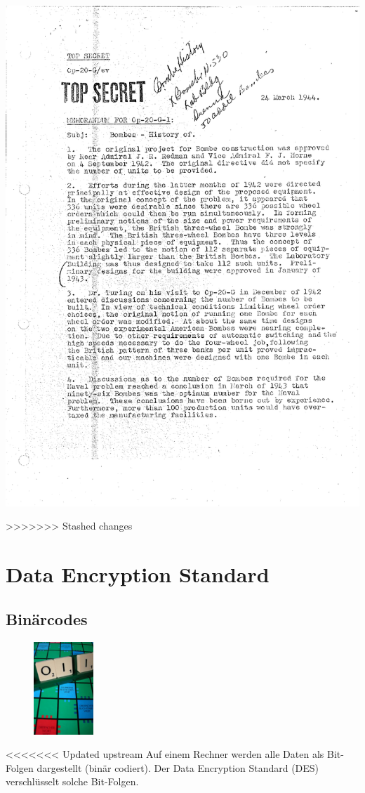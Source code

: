 \documentclass[%
<<<<<<< Updated upstream
11pt,%
twoside,%
titlepage,%
german,%
headsepline%
]{scrartcl}
\begin{document}
\includegraphics[width=1\textwidth,page=2]{pictures/memorandumbombes.pdf}

\clearpage

>>>>>>> Stashed changes
\section{Data Encryption Standard}
\subsection{Binärcodes}

\begin{figure}
\vspace{-26pt}
  \begin{center}
    \includegraphics[width=0.2\textwidth]{pictures/scrabble}
  \end{center}
\vspace{-0pt}
\end{figure}
<<<<<<< Updated upstream
Auf einem Rechner werden alle Daten als Bit-Folgen dargestellt (binär codiert). Der Data Encryption Standard (DES) verschlüsselt solche Bit-Folgen.
\end{document}
